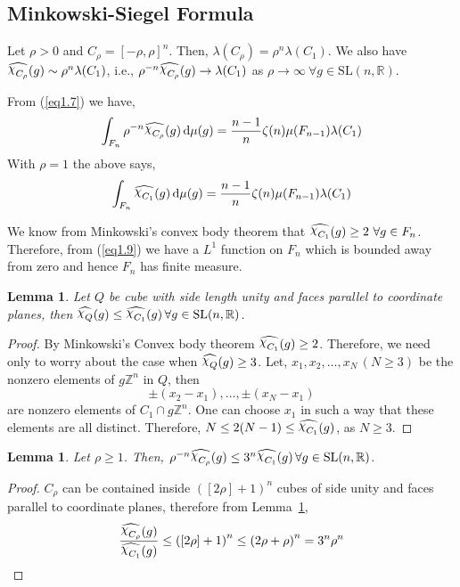 \documentclass[11pt]{article}
\newtheorem{lemma}[theorem]{Lemma}
\theoremstyle{definition}
\newcommand{\mychi}{\raisebox{2pt}{$\chi$}}
\begin{document}
\subsection{Minkowski-Siegel Formula}
Let $\rho >0$ and $C_ \rho = {[-\rho, \rho ]}^n$.
Then, $\lambda (C_ \rho )= \rho ^n \lambda (C_1)$.
We also have $\widehat{\mychi _{C_ \rho }}(g) \sim \rho ^n \lambda (C_1)$, i.e., $\rho ^{-n} \widehat{\mychi _{C_ \rho }}(g) \to \lambda (C_1)$ as $\rho \to \infty \ \forall g \in \mathrm{SL}(n, \mathbb{R})$.

From (\ref{eq1.7}) we have,
\begin{align}\label{eq1.8}
    \int_{F_n}\rho ^{-n} \widehat{\mychi _{C_ \rho }} (g)\, \mathrm{d} \mu (g) = \frac{n-1}{n} \zeta (n)\mu (F_{n-1}) \lambda (C_1)
\end{align}
With $\rho =1$ the above says,
\begin{equation}\label{eq1.9}
    \int_{F_n} \widehat{\mychi _{C_1 }} (g)\, \mathrm{d} \mu (g)= \frac{n-1}{n} \zeta (n)\mu (F_{n-1})\lambda (C_1)
\end{equation}

We know from Minkowski's convex body theorem that $\widehat{\mychi _{C_1}}(g) \ge 2 \ \forall g \in F_n$.
Therefore, from (\ref{eq1.9}) we have a $L^1$ function on $F_n$ which is bounded away from zero and hence $F_n$ has finite measure.
\begin{lemma}\label{lem1.5.1}
    Let $Q$ be cube with side length unity and faces parallel to coordinate planes, then $\widehat{\mychi _{Q}}(g) \le \widehat{\mychi _{C_1}}(g) \, \forall g \in \mathrm{SL}(n, \mathbb{R})$.
\end{lemma}
\begin{proof}
    By Minkowski's Convex body theorem $\widehat{\mychi _{C_1}}(g) \ge 2$.
    Therefore, we need only to worry about the case when $\widehat{\mychi _{Q}}(g) \ge 3$.
    Let, $x_1, x_2, \ldots , x_N \,(N \ge 3)$ be the nonzero elements of $g\mathbb{Z}^n$ in $Q$, then
    \[	
        \pm(x_2-x_1), \ldots , \pm(x_N-x_1)
    \]
    are nonzero elements of $C_1 \cap g \mathbb{Z}^n$.
    One can choose $x_1$ in such a way that these elements are all distinct.
    Therefore,  $N \le 2(N-1) \le \widehat{\mychi _{C_1}}(g)$, as $N \ge 3$.
\end{proof}

\begin{lemma}\label{lem1.5.2}
    Let $\rho \ge 1$.
    Then, $ \rho ^{-n}\widehat{\mychi _{C_ \rho }}(g) \le 3^n \widehat{\mychi _{C_1}}(g) \, \forall g \in \mathrm{SL}(n, \mathbb{R})$.
\end{lemma}
\begin{proof}
    $C_ \rho $ can be contained inside ${([2 \rho ]+1)}^n$ cubes of side unity and faces parallel to coordinate planes, therefore from Lemma~\ref{lem1.5.1},
    \[	
        \frac{\widehat{\mychi _{C_ \rho }}(g)}{\widehat{\mychi _{C_1}}(g)} \le {([2 \rho ]+1)}^n \le {(2 \rho + \rho )}^n=3^n \rho ^n
    \]
\end{proof}
\end{document}
